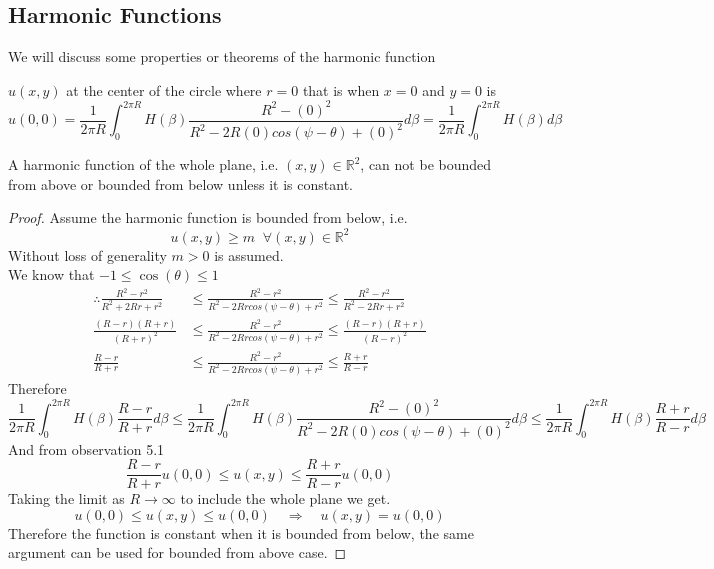 \documentclass[]{article}
\begin{document}
\subsection{Harmonic Functions}
We will discuss some properties or theorems of the harmonic function
\begin{observation}
    $u(x,y)$ at the center of the circle where $r=0$ that is when $x=0$ and $y=0$ is
    \[
        u(0,0) = \frac{1}{2\pi R}\int_{0}^{2\pi R} H(\beta)\frac{R^2-(0)^2}{R^2-2R(0)cos(\psi  -\theta)+(0)^2}d\beta =\frac{1}{2\pi R}\int_{0}^{2\pi R} H(\beta)d\beta     
    \]
\end{observation}    
\begin{theorem}
    A harmonic function of the whole plane, i.e. $(x,y) \in \mathbb{R}^2$, can not be bounded from above or bounded from below unless it is constant.    
\end{theorem}
\begin{proof}
    Assume the harmonic function is bounded from below, i.e.    
    \[
        u(x,y) \geq m \;\; \forall (x,y) \in \mathbb{R}^2     
    \]
    Without loss of generality $m > 0$ is assumed.
    \\
    We know that $ -1 \leq \cos(\theta) \leq 1$
    \begin{align*}
        \therefore
        \frac{R^2-r^2}{R^2+2Rr+r^2} &\leq \frac{R^2-r^2}{R^2-2Rrcos(\psi  -\theta)+r^2} \leq \frac{R^2-r^2}{R^2-2Rr+r^2}
        \\
        \frac{(R-r)(R+r)}{{(R+r)}^2} &\leq \frac{R^2-r^2}{R^2-2Rrcos(\psi  -\theta)+r^2} \leq \frac{(R-r)(R+r)}{{(R-r)}^2}
        \\
        \frac{R-r}{R+r} &\leq \frac{R^2-r^2}{R^2-2Rrcos(\psi  -\theta)+r^2} \leq \frac{R+r}{R-r}
    \end{align*}
    Therefore
    \[
        \frac{1}{2\pi R}\int_{0}^{2\pi R} H(\beta)\frac{R-r}{R+r} d\beta \leq \frac{1}{2\pi R}\int_{0}^{2\pi R} H(\beta)\frac{R^2-(0)^2}{R^2-2R(0)cos(\psi  -\theta)+(0)^2}d\beta \leq \frac{1}{2\pi R}\int_{0}^{2\pi R} H(\beta)\frac{R+r}{R-r} d\beta    
    \]
    And from observation 5.1 
    \[
        \frac{R-r}{R+r} u(0,0) \leq u(x,y) \leq \frac{R+r}{R-r} u(0,0)    
    \]
    Taking the limit as $R \to \infty$ to include the whole plane we get.
    \[
        u(0,0) \leq u(x,y) \leq u(0,0) \quad \Rightarrow \quad u(x,y) = u(0,0)    
    \]
    Therefore the function is constant when it is bounded from below, the same argument can be used for bounded from above case.
\end{proof}
\end{document}
